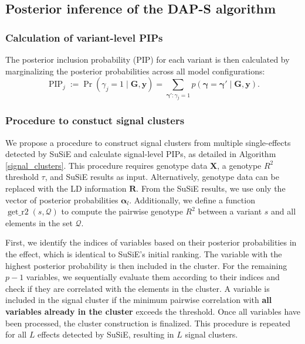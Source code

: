 \documentclass[pdflatex,sn-mathphys-num]{sn-jnl}%
\theoremstyle{thmstyleone}%
\theoremstyle{thmstyletwo}%
\theoremstyle{thmstylethree}%
\begin{document}
\subsection{Posterior inference of the DAP-S algorithm}
\subsubsection{Calculation of variant-level PIPs}
The posterior inclusion probability (PIP) for each variant is then calculated by marginalizing the posterior probabilities across all model configurations:
\begin{equation}
    \operatorname{PIP}_j:=\operatorname{Pr}\left(\gamma_j=1 \mid \mathbf{G},\mathbf{y}\right)=\sum_{\boldsymbol{\gamma}':\gamma_j=1} p(\boldsymbol{\gamma}=\boldsymbol{\gamma}' \mid \mathbf{G},\mathbf{y}).
\end{equation}




\subsubsection{Procedure to constuct signal clusters}
We propose a procedure to construct signal clusters from multiple single-effects detected by SuSiE and calculate signal-level PIPs, as detailed in Algorithm \ref{signal_clusters}. This procedure requires genotype data $\mathbf{X}$, a genotype $R^2$ threshold $\tau$, and SuSiE results as input. Alternatively, genotype data can be replaced with the LD information $\mathbf{R}$. From the SuSiE results, we use only the vector of posterior probabilities $\boldsymbol{\alpha}_l$. Additionally, we define a function $\operatorname{get\_r2}\left(s,\mathcal{Q}\right)$ to compute the pairwise genotype $R^2$ between a variant $s$ and all elements in the set $\mathcal{Q}$.

First, we identify the indices of variables based on their posterior probabilities in the effect, which is identical to SuSiE's initial ranking. The variable with the highest posterior probability is then included in the cluster. For the remaining $p-1$ variables, we sequentially evaluate them according to their indices and check if they are correlated with the elements in the cluster. A variable is included in the signal cluster if the minimum pairwise correlation with \textbf{all variables already in the cluster} exceeds the threshold. Once all variables have been processed, the cluster construction is finalized. This procedure is repeated for all $L$ effects detected by SuSiE, resulting in $L$ signal clusters.
\end{document}

